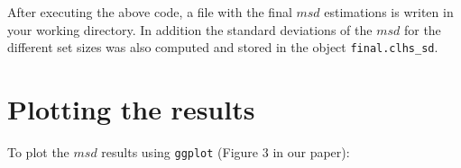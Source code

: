 \documentclass[]{book}
\newenvironment{Shaded}{\begin{snugshade}}{\end{snugshade}}
\newcommand{\CharTok}[1]{\textcolor[rgb]{0.31,0.60,0.02}{#1}}
\newcommand{\CommentTok}[1]{\textcolor[rgb]{0.56,0.35,0.01}{\textit{#1}}}
\newcommand{\ControlFlowTok}[1]{\textcolor[rgb]{0.13,0.29,0.53}{\textbf{#1}}}
\newcommand{\DataTypeTok}[1]{\textcolor[rgb]{0.13,0.29,0.53}{#1}}
\newcommand{\DecValTok}[1]{\textcolor[rgb]{0.00,0.00,0.81}{#1}}
\newcommand{\FloatTok}[1]{\textcolor[rgb]{0.00,0.00,0.81}{#1}}
\newcommand{\KeywordTok}[1]{\textcolor[rgb]{0.13,0.29,0.53}{\textbf{#1}}}
\newcommand{\NormalTok}[1]{#1}
\newcommand{\OperatorTok}[1]{\textcolor[rgb]{0.81,0.36,0.00}{\textbf{#1}}}
\newcommand{\StringTok}[1]{\textcolor[rgb]{0.31,0.60,0.02}{#1}}
\begin{document}
\begin{Shaded}
\end{Shaded}

After executing the above code, a file with the final \(msd\) estimations is writen in your working directory. In addition the standard deviations of the \(msd\) for the different set sizes was also computed and stored in the object \texttt{final.clhs\_sd}.

\hypertarget{plotting-the-results}{%
\section{Plotting the results}\label{plotting-the-results}}

To plot the \(msd\) results using \texttt{ggplot} (Figure 3 in our paper):
\end{document}
